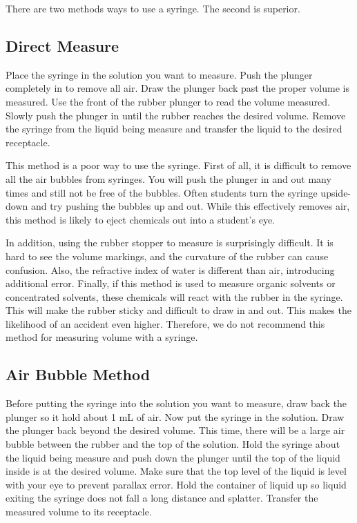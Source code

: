 There are two methods ways to use a syringe. The second is superior.

\subsection{Direct Measure}
Place the syringe in the solution you want to measure. Push the plunger completely in to remove all air. Draw the plunger back past the proper volume is measured. Use the front of the rubber plunger to read the volume measured. Slowly push the plunger in until the rubber reaches the desired volume. Remove the syringe from the liquid being measure and transfer the liquid to the desired receptacle.

This method is a poor way to use the syringe. First of all, it is difficult to remove all the air bubbles from syringes. You will push the plunger in and out many times and still not be free of the bubbles. Often students turn the syringe upside-down and try pushing the bubbles up and out. While this effectively removes air, this method is likely to eject chemicals out into a student’s eye. 

In addition, using the rubber stopper to measure is surprisingly difficult. It is hard to see the volume markings, and the curvature of the rubber can cause confusion. Also, the refractive index of water is different than air, introducing additional error. Finally, if this method is used to measure organic solvents or concentrated solvents, these chemicals will react with the rubber in the syringe. This will make the rubber sticky and difficult to draw in and out. This makes the likelihood of an accident even higher. Therefore, we do not recommend this method for measuring volume with a syringe.

\subsection{Air Bubble Method}
Before putting the syringe into the solution you want to measure, draw back the plunger so it hold about 1 mL of air. Now put the syringe in the solution. Draw the plunger back beyond the desired volume. This time, there will be a large air bubble between the rubber and the top of the solution. Hold the syringe about the liquid being measure and push down the plunger until the top of the liquid inside is at the desired volume. Make sure that the top level of the liquid is level with your eye to prevent parallax error. Hold the container of liquid up so liquid exiting the syringe does not fall a long distance and splatter. Transfer the measured volume to its receptacle. 

